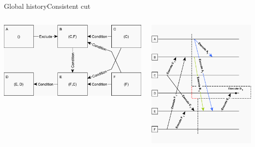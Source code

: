 \documentclass{beamer}
\begin{document}
\begin{frame}{Global history}{Consistent cut}
 	\begin{columns}[T, onlytextwidth]
        \begin{column}{0.5\textwidth}
        	\vspace{2cm}
			\includegraphics[width=0.95\linewidth]{figures/inconsistent-cut.pdf}
        \end{column}
        \begin{column}{0.5\textwidth}
        	\includegraphics[width=\linewidth]{figures/consistent-cut.pdf}
        \end{column}
    \end{columns}
\end{frame}
\end{document}
